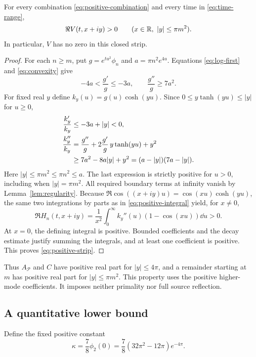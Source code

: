 \begin{theorem}\label{thm:strip-positive}
For every combination \eqref{eq:positive-combination} and every time in
\eqref{eq:time-range},
\begin{equation}\label{eq:positive-strip}
 \Re V(t,x+iy)>0\qquad(x\in\mathbb R,\ |y|\le\pi m^2).
\end{equation}
In particular, $V$ has no zero in this closed strip.
\end{theorem}
\begin{proof}
For each $n\ge m$, put $g=e^{tu^2}\phi_n$ and
$a=\pi n^2e^{4u}$. Equations \eqref{eq:log-first} and
\eqref{eq:convexity} give
\[
 -4a<\frac{g'}g\le-3a,\qquad \frac{g''}g\ge7a^2.
\]
For fixed real $y$ define $k_y(u)=g(u)\cosh(yu)$. Since
$0\le y\tanh(yu)\le|y|$ for $u\ge0$,
\begin{align}
 \frac{k_y'}{k_y}&\le-3a+|y|<0,\notag\\
 \frac{k_y''}{k_y}
 &=\frac{g''}g+2\frac{g'}g\,y\tanh(yu)+y^2\notag\\
 &\ge7a^2-8a|y|+y^2
   =(a-|y|)(7a-|y|).\label{eq:strip-convexity}
\end{align}
Here $|y|\le\pi m^2\le\pi n^2\le a$. The last expression is
strictly positive for $u>0$, including when $|y|=\pi m^2$.
All required boundary terms at infinity vanish by
Lemma~\ref{lem:regularity}. Because
$\Re\cos((x+iy)u)=\cos(xu)\cosh(yu)$, the same two integrations by
parts as in \eqref{eq:positive-integral} yield, for $x\ne0$,
\[
 \Re H_n(t,x+iy)
 =\frac1{x^2}\int_0^\infty k_y''(u)(1-\cos(xu))\dd u>0.
\]
At $x=0$, the defining integral is positive. Bounded coefficients and
the decay estimate justify summing the integrals, and at least one
coefficient is positive. This proves \eqref{eq:positive-strip}.
\end{proof}

Thus $A_{\mathcal P}$ and $C$ have positive real part for $|y|\le4\pi$,
and a remainder starting at $m$ has positive real part for
$|y|\le\pi m^2$. This property uses the positive higher-mode
coefficients. It imposes neither primality nor full source reflection.

\subsection{A quantitative lower bound}

Define the fixed positive constant
\begin{equation}\label{eq:kappa}
 \kappa=\frac78\phi_2(0)
       =\frac78(32\pi^2-12\pi)e^{-4\pi}.
\end{equation}

